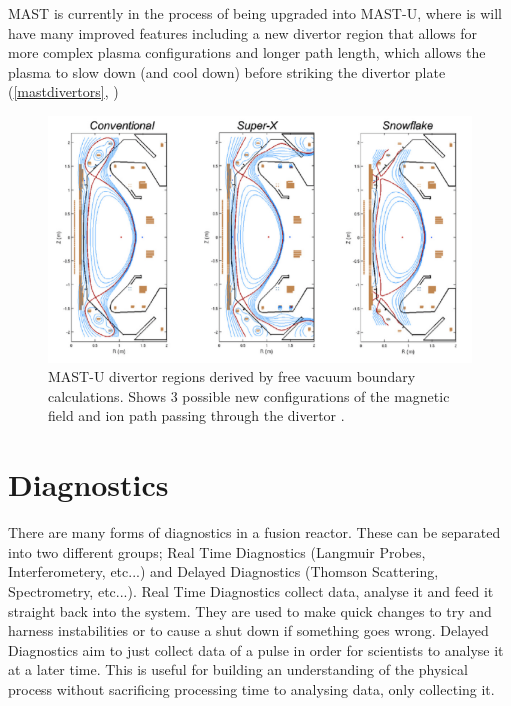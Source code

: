 \documentclass[12pt,a4paper,oneside]{report}
\begin{document}
MAST is currently in the process of being upgraded into MAST-U, where is will have many improved features including a new divertor region that allows for more complex plasma configurations and longer path length, which allows the plasma to slow down (and cool down) before striking the divertor plate (\autoref{mastdivertors}, \cite{CulhamCenterforFusionEnergyResearch:Upgrade})

\begin{figure}[H]
\includegraphics[width=1\textwidth, center,angle=0]{Images/MASTUdivertors}
\caption{MAST-U divertor regions derived by free vacuum boundary calculations. Shows 3 possible new configurations of the magnetic field and ion path passing through the divertor \cite{CulhamCenterforFusionEnergyResearch:Upgrade}.}
\label{mastdivertors}
\end{figure}

	\section{Diagnostics}
There are many forms of diagnostics in a fusion reactor. These can be separated into two different groups; Real Time Diagnostics (Langmuir Probes, Interferometery, etc...) and Delayed Diagnostics (Thomson Scattering\cite{Scannell2008DesignMAST}, Spectrometry, etc...). Real Time Diagnostics collect data, analyse it and feed it straight back into the system. They are used to make quick changes to try and harness instabilities or to cause a shut down if something goes wrong. Delayed Diagnostics aim to just collect data of a pulse in order for scientists to analyse it at a later time. This is useful for building an understanding of the physical process without sacrificing processing time to analysing data, only collecting it. 
\medskip
\end{document}
